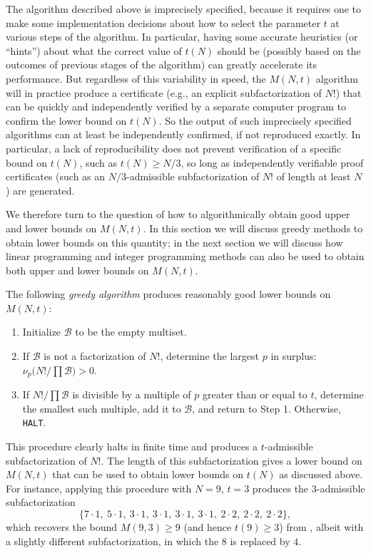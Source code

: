 \documentclass[10pt,a4paper,reqno]{amsart}
\numberwithin{equation}{section}
\theoremstyle{plain}
\theoremstyle{definition}
\newcommand\tuple{{\mathcal B}}
\begin{document}
The algorithm described above is imprecisely specified, because it requires one to make some implementation decisions about how to select the parameter $t$ at various steps of the algorithm. In particular, having some accurate heuristics (or ``hints'') about what the correct value of $t(N)$ should be (possibly based on the outcomes of previous stages of the algorithm) can greatly accelerate its performance.  But regardless of this variability in speed, the $M(N,t)$ algorithm will in practice produce a certificate (e.g., an explicit subfactorization of $N!$) that can be quickly and independently verified by a separate computer program to confirm the lower bound on $t(N)$.  So the output of such imprecisely specified algorithms can at least be independently confirmed, if not reproduced exactly.  In particular, a lack of reproducibility does not prevent verification of a specific bound on $t(N)$, such as $t(N) \geq N/3$, so long as independently verifiable proof certificates (such as an $N/3$-admissible subfactorization of $N!$ of length at least $N$) are generated.

We therefore turn to the question of how to algorithmically obtain good upper and lower bounds on $M(N,t)$.  In this section we will discuss greedy methods to obtain lower bounds on this quantity; in the next section we will discuss how linear programming and integer programming methods can also be used to obtain both upper and lower bounds on $M(N,t)$.

The following \textit{greedy algorithm} produces reasonably good lower bounds on $M(N,t)$:

\begin{enumerate}
\item[Step 0:] Initialize $\tuple$ to be the empty multiset.
\item[Step 1:] If $\tuple$ is not a factorization of $N!$, determine the largest $p$ in surplus: $\nu_p\bigl(N!/\prod \tuple\bigr) > 0$.
\item[Step 2:] If $N! / \prod \tuple$ is divisible by a multiple of $p$ greater than or equal to $t$, determine the smallest such multiple, add it to $\tuple$, and return to Step 1.  Otherwise, \texttt{HALT}.
\end{enumerate}

This procedure clearly halts in finite time and produces a $t$-admissible subfactorization of $N!$.
The length of this subfactorization gives a lower bound on $M(N,t)$ that can be used to obtain lower bounds on $t(N)$ as discussed above.  For instance, applying this procedure with $N=9$, $t=3$ produces the $3$-admissible subfactorization
\[
\bigl\{7 \cdot 1,\ 5 \cdot 1,\ 3 \cdot 1,\ 3 \cdot 1,\ 3 \cdot 1,\ 3 \cdot 1,\ 2 \cdot 2,\ 2 \cdot 2,\ 2 \cdot 2 \bigr\},
\]
which recovers the bound $M(9,3) \geq 9$ (and hence $t(9) \geq 3$) from , albeit with a slightly different subfactorization, in which the $8$ is replaced by $4$.
\end{document}
